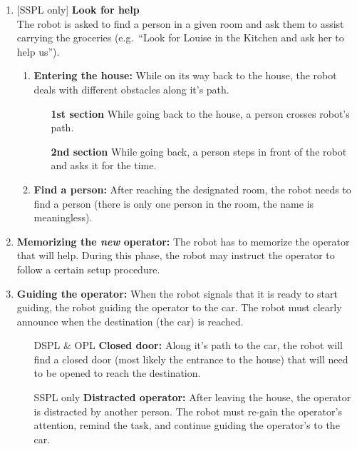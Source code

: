 \begin{enumerate}
  \setcounter{enumi}{\theenumTemp}
  \item {[SSPL only]} \textbf{Look for help} \\
  The robot is asked to find a person in a given room and ask them to assist carrying the groceries (e.g.~\enquote{Look for Louise in the Kitchen and ask her to help us}).
  \begin{enumerate}
    \item \textbf{Entering the house:} While on its way back to the house, the robot deals with different obstacles along it's path.
    \begin{itemize}[leftmargin=3cm]
      \item[\textbf{1st section}] While going back to the house, a person crosses robot's path.
      \item[\textbf{2nd section}] While going back, a person steps in front of the robot and asks it for the time.
    \end{itemize}

    \item \textbf{Find a person:} After reaching the designated room, the robot needs to find a person (there is only one person in the room, the name is meaningless).
  \end{enumerate}

  \item \textbf{Memorizing the \emph{new} operator:} The robot has to memorize the operator that will help. During this phase, the robot may instruct the operator to follow a certain setup procedure.

  \item \textbf{Guiding the operator:} When the robot signals that it is ready to start guiding, the robot guiding the operator to the car. The robot must clearly announce when the destination (the car) is reached.
  \begin{itemize}[leftmargin=3cm]
    \item[DSPL \& OPL] \textbf{Closed door:} Along it's path to the car, the robot will find a closed door (most likely the entrance to the house) that will need to be opened to reach the destination.
    \item[SSPL only] \textbf{Distracted operator:} After leaving the house, the operator is distracted by another person. The robot must re-gain the operator's attention, remind the task, and continue guiding the operator's to the car.
  \end{itemize}

\end{enumerate}


